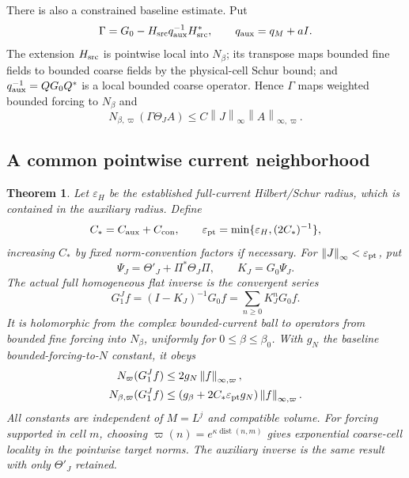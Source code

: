 \documentclass[11pt]{article}
\newtheorem{theorem}{Theorem}[section]
\newcommand{\norm}[1]{\left\lVert#1\right\rVert}
\begin{document}
There is also a constrained baseline estimate. Put
\begin{equation}\label{pc-constrained-baseline}
 \Gamma=G_0-H_{\rm src}q_{\rm aux}^{-1}H_{\rm src}^*,
 \qquad q_{\rm aux}=q_M+aI.
\end{equation}
The extension $H_{\rm src}$ is pointwise local into $N_\beta$;
its transpose maps bounded fine fields to bounded coarse fields
by the physical-cell Schur bound; and
$q_{\rm aux}^{-1}=QG_0Q^*$ is a local bounded coarse operator.
Hence $\Gamma$ maps weighted bounded forcing to $N_\beta$ and
\begin{equation}\label{pc-constrained-current}
 N_{\beta,\varpi}(\Gamma\Theta_JA)
      \le C\norm{J}_\infty\norm{A}_{\infty,\varpi}.
\end{equation}

\subsection{A common pointwise current neighborhood}

\begin{theorem}\label{pc-theorem}
Let $\varepsilon_H$ be the established full-current Hilbert/Schur
radius, which is contained in the auxiliary radius. Define
\begin{equation}\label{pc-radius}
 C_*=C_{\rm aux}+C_{\rm con},\qquad
 \varepsilon_{\rm pt}
       =\min\{\varepsilon_H,(2C_*)^{-1}\},
\end{equation}
increasing $C_*$ by fixed norm-convention factors if necessary.
For $\norm{J}_\infty<\varepsilon_{\rm pt}$, put
\begin{equation}\label{pc-full-perturbation}
 \Psi_J=\Theta'_J+\Pi^*\Theta_J\Pi,\qquad
 K_J=G_0\Psi_J.
\end{equation}
The actual full homogeneous flat inverse is the convergent series
\begin{equation}\label{pc-neumann-inverse}
 G_1^Jf=(I-K_J)^{-1}G_0f
                  =\sum_{n\ge0}K_J^nG_0f.
\end{equation}
It is holomorphic from the complex bounded-current ball to operators
from bounded fine forcing into $N_\beta$, uniformly for
$0\le\beta\le\beta_0$. With $g_N$ the baseline bounded-forcing-to-$N$
constant, it obeys
\begin{align}
 N_\varpi(G_1^Jf)
       &\le2g_N\norm{f}_{\infty,\varpi},
       \label{pc-inverse-N}\\
 N_{\beta,\varpi}(G_1^Jf)
       &\le(g_\beta+2C_*\varepsilon_{\rm pt}g_N)
                              \norm{f}_{\infty,\varpi}.
       \label{pc-inverse-Nbeta}
\end{align}
All constants are independent of $M=L^j$ and compatible volume.
For forcing supported in cell $m$, choosing
$\varpi(n)=e^{\kappa\operatorname{dist}(n,m)}$ gives exponential
coarse-cell locality in the pointwise target norms. The auxiliary
inverse is the same result with only $\Theta'_J$ retained.
\end{theorem}
\end{document}
